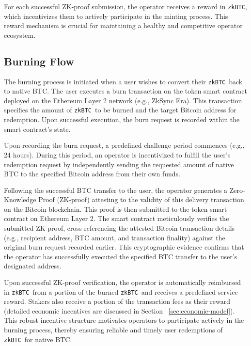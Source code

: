 \documentclass{DESSThesis}
\newcommand{\zktoken}{\texttt{zkBTC}}
\begin{document}
For each successful ZK-proof submission, the operator receives a reward in \zktoken, which incentivizes them to actively participate in the minting process. This reward mechanism is crucial for maintaining a healthy and competitive operator ecosystem.


\subsection{Burning Flow} \label{subsec:burning-flow}
The burning process is initiated when a user wishes to convert their \zktoken\ back to native BTC. The user executes a burn transaction on the token smart contract deployed on the Ethereum Layer 2 network (e.g., ZkSync Era). This transaction specifies the amount of \zktoken\ to be burned and the target Bitcoin address for redemption. Upon successful execution, the burn request is recorded within the smart contract's state.

Upon recording the burn request, a predefined challenge period commences (e.g., 24 hours). During this period, an operator is incentivized to fulfill the user's redemption request by independently sending the requested amount of native BTC to the specified Bitcoin address from their own funds.

Following the successful BTC transfer to the user, the operator generates a Zero-Knowledge Proof (ZK-proof) attesting to the validity of this delivery transaction on the Bitcoin blockchain. This proof is then submitted to the token smart contract on Ethereum Layer 2. The smart contract meticulously verifies the submitted ZK-proof, cross-referencing the attested Bitcoin transaction details (e.g., recipient address, BTC amount, and transaction finality) against the original burn request recorded earlier. This cryptographic evidence confirms that the operator has successfully executed the specified BTC transfer to the user's designated address.

Upon successful ZK-proof verification, the operator is automatically reimbursed in \zktoken\ from a portion of the burned \zktoken\ and receives a predefined service reward. Stakers also receive a portion of the transaction fees as their reward (detailed economic incentives are discussed in Section ~\ref{sec:economic-model}). This robust incentive structure motivates operators to participate actively in the burning process, thereby ensuring reliable and timely user redemptions of \zktoken\ for native BTC.
\end{document}
